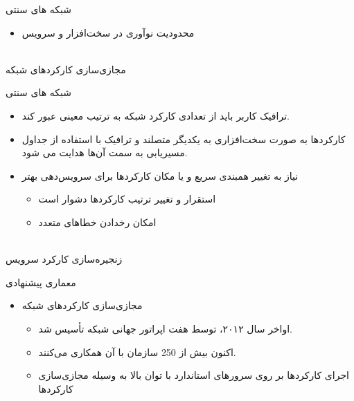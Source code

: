 \documentclass{beamer}
\makeatletter
\newcommand{\RTList}{\raggedleft\rightskip\@totalleftmargin}
\makeatother
\begin{document}
\begin{persian}
\begin{frame}{شبکه های سنتی}
\begin{itemize}
\begin{itemize}
            \item محدودیت نوآوری در سخت‌افزار و سرویس
        \end{itemize}
    \end{itemize}
    \begin{block}{}
        \centering
        \\
        مجازی‌سازی کارکردهای شبکه
    \end{block}
\end{frame}
\begin{frame}{شبکه های سنتی}
    \begin{itemize}\RTList{}
        \justifying
        \item ترافیک کاربر باید از تعدادی کارکرد شبکه به ترتیب معینی عبور کند.
        \item کارکردها به صورت سخت‌افزاری به یکدیگر متصلند و ترافیک با استفاده از جداول مسیریابی به سمت آن‌ها هدایت می شود.
        \item نیاز به تغییر همبندی سریع و یا مکان کارکردها برای سرویس‌دهی بهتر 
        \begin{itemize}\RTList{}
            \item استقرار و تغییر ترتیب کارکردها دشوار است
            \item امکان رخدادن خطاهای متعدد
        \end{itemize}
    \end{itemize}
    \begin{block}{}
        \centering
        \\
        زنجیره‌سازی کارکرد سرویس
    \end{block}
\end{frame}
\begin{frame}{معماری پیشنهادی}
    \begin{itemize}\RTList{}
        \justifying
        \item مجازی‌سازی کارکردهای شبکه 
        \begin{itemize}\RTList{}
            \item اواخر سال ۲۰۱۲،  توسط هفت اپراتور جهانی شبکه تأسیس شد.
            \item اکنون بیش از 250 سازمان با آن همکاری می‌کنند.
            \item اجرای کارکردها بر روی سرورهای استاندارد با توان بالا به وسیله مجازی‌سازی کارکردها

\end{itemize}
\end{itemize}
\end{frame}
\end{persian}
\end{document}
